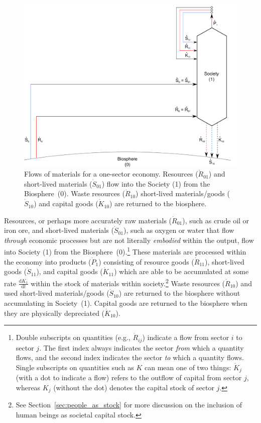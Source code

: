 \begin{landscape}
\begin{figure}[!ht]
\centering{}
\includegraphics[width=0.8\linewidth]{Part_1/Chapter_Materials/images/1_sector_materials.pdf}
\caption[Flows of materials for a one-sector economy]{Flows of materials 
for a one-sector economy. 
Resources ($\dot{R}_{01}$) and short-lived materials 
($\dot{S}_{01}$) flow into the Society (1) 
from the Biosphere~(0). Waste resources 
($\dot{R}_{10}$) short-lived materials/goods 
($\dot{S}_{10}$) and capital goods
($\dot{K}_{10}$) are returned to the biosphere.}
\label{fig:A_materials}
\end{figure}
\end{landscape}

Resources, or perhaps more accurately raw materials
($\dot{R}_{01}$), such as crude oil or iron ore, 
and short-lived materials ($\dot{S}_{01}$), 
such as oxygen or water that flow 
\emph{through} economic processes but are not 
literally \emph{embodied} within the output, 
flow into Society (1) from the 
Biosphere~(0).\footnote{Double 
	subscripts on quantities
	(e.g., $\dot{R}_{ij}$) indicate a flow 
	from sector $i$ to sector $j$. 
	The first index always indicates the sector \emph{from} which a quantity flows, 
	and the second index indicates the sector \emph{to} which a quantity flows.
	Single subscripts on quantities such as
	$K$ can mean one of two things: 
	$\dot{K}_{j}$ (with a dot to indicate a flow) refers to 
	the outflow of capital from sector $j$, 
	whereas $K_{j}$ (without the dot) 
	denotes the capital stock of sector $j$.
	} 
These materials are processed within the economy 
into products ($\dot{P}_{1}$) consisting of 
resource goods ($\dot{R}_{11}$), 
short-lived goods ($\dot{S}_{11}$), 
and capital goods ($\dot{K}_{11}$)
which are able to be accumulated at some rate 
$\frac{\mathrm{d}K_{1}}{\mathrm{d}t}$ 
within the stock of materials within society.\footnote{See
	Section~\ref{sec:people_as_stock} for more discussion on
	the inclusion of human beings as societal capital stock.
	}
Waste resources ($\dot{R}_{10}$) and 
used short-lived materials/goods ($\dot{S}_{10}$)
are returned to the biosphere
without accumulating in Society~(1). 
Capital goods are returned to the biosphere
when they are physically depreciated ($\dot{K}_{10}$).

